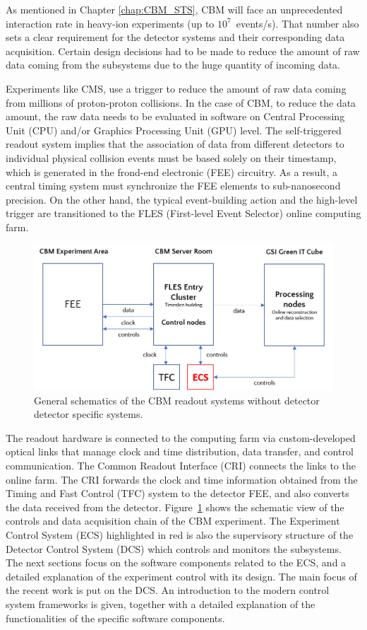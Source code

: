 
As mentioned in Chapter \ref{chap:CBM_STS}, \gls{CBM} will face an unprecedented interaction rate in heavy-ion experiments (up to $10^{7}$~events/s). That number also sets a clear requirement for the detector systems and their corresponding data acquisition. Certain design decisions had to be made to reduce the amount of raw data coming from the subsystems due to the huge quantity of incoming data.

Experiments like \gls{CMS}, use a trigger to \cite{CMS-DAQ} reduce the amount of raw data coming from millions of proton-proton collisions.  In the case of \gls{CBM}, to reduce the data amount, the raw data needs to be evaluated in software on Central Processing Unit (\gls{CPU}) and/or Graphics Processing Unit (\gls{GPU}) level. The self-triggered readout system implies that the association of data from different detectors to individual physical collision events must be based solely on their timestamp, which is generated in the frond-end electronic (\gls{FEE}) circuitry. As a result, a central timing system must synchronize the \gls{FEE} elements to sub-nanosecond precision. On the other hand, the typical event-building action and the high-level trigger are transitioned to the \gls{FLES} (First-level Event Selector) online computing farm. 


\begin{figure}[!h]
\centering
\includegraphics[width=0.7\columnwidth]{Chapter3/Controls/images/online.png}
\caption{General schematics of the CBM readout systems without detector detector specific systems.}
\label{fig_controls}
\end{figure}

\newpage
The readout hardware is connected to the computing farm via custom-developed optical links that manage clock and time distribution, data transfer, and control communication. The Common Readout Interface (\gls{CRI}) connects the links to the online farm. The \gls{CRI} forwards the clock and time information obtained from the Timing and Fast Control (\gls{TFC}) system to the detector \gls{FEE}, and also converts the data received from the detector. Figure~\ref{fig_controls} shows the schematic view of the controls and data acquisition chain of the \gls{CBM} experiment. The Experiment Control System (\gls{ECS}) highlighted in red is also the supervisory structure of the Detector Control System (\gls{DCS}) which controls and monitors the subsystems. The next sections focus on the software components related to the \gls{ECS}, and a detailed explanation of the experiment control with its design. The main focus of the recent work is put on the \gls{DCS}. An introduction to the modern control system frameworks is given, together with a detailed explanation of the functionalities of the specific software components. 
